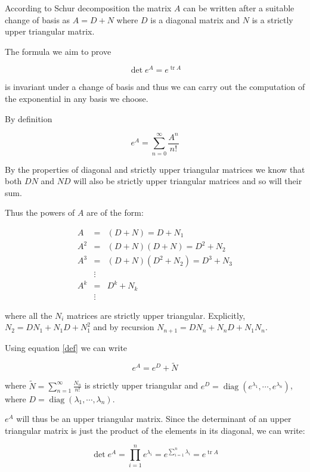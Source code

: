 \documentclass[12pt]{article}
\newcommand{\trace}{\operatorname{tr}}
\begin{document}
According to Schur decomposition the matrix $A$ can be written after a suitable change of basis as $A=D+N$ where $D$ is a diagonal matrix and $N$ is a strictly upper triangular matrix.

The formula we aim to prove

$$ \det e^A = e^{\trace A} $$

is invariant under a change of basis and thus we can carry out the computation of the exponential in any basis we choose.

By definition

\begin{equation}
\label{def}
e^A = \sum_{n=0}^{\infty} \frac{A^n}{n!}
\end{equation}

By the properties of diagonal and strictly upper triangular matrices we know that both $DN$ and $ND$ will also be strictly upper triangular matrices and so will their sum.

Thus the powers of $A$ are of the form:

\begin{eqnarray}
A   &=& (D+N) = D+N_1\\
A^2 &=& (D+N)(D+N) = D^2 + N_2 \\
A^3 &=& (D+N)(D^2 + N_2) = D^3 + N_3\\
    &\vdots& \\
A^k &=& D^k + N_k \\
    &\vdots& 
\end{eqnarray}

where all the $N_i$ matrices are strictly upper triangular.
Explicitly, $N_2 = DN_1+N_1D+N_1^2$ and by recursion $N_{n+1} = DN_n + N_n D + N_1 N_n$.

Using equation \ref{def} we can write

\begin{equation}
e^A = e^D + \tilde{N}
\end{equation}

where $\tilde{N} = \sum_{n=1}^{\infty}\frac{N_n}{n!}$ is strictly upper triangular and $e^D = \operatorname{diag}(e^{\lambda_1}, \cdots, e^{\lambda_n})$, where $D=\operatorname{diag}(\lambda_1, \cdots,\lambda_n)$.

$e^A$ will thus be an upper triangular matrix.
Since the determinant of an upper triangular matrix is just the product of the elements in its diagonal, we can write:

\begin{equation}
\label{result}
\det e^A = \prod_{i=1}^{n} e^{\lambda_i} = e^{\sum_{i=1}^n \lambda_i} = e^{\trace A}
\end{equation}
\end{document}
